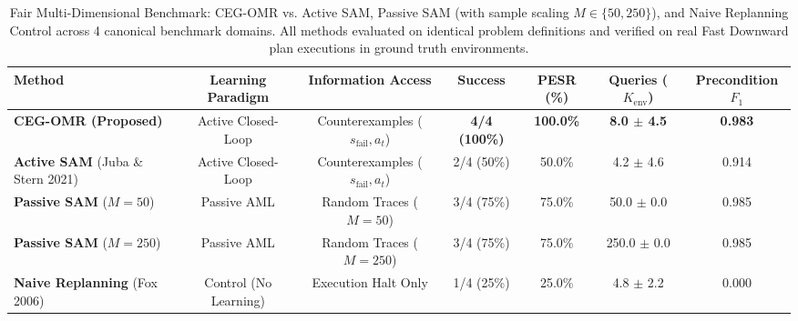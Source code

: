 \begin{table}[t]
\centering
\caption{Fair Multi-Dimensional Benchmark: CEG-OMR vs. Active SAM, Passive SAM (with sample scaling $M \in \{50, 250\}$), and Naive Replanning Control across 4 canonical benchmark domains. All methods evaluated on identical problem definitions and verified on real Fast Downward plan executions in ground truth environments.}
\label{tab:fair_comparison}
\small
\begin{tabular}{lcccccc}
\toprule
\textbf{Method} & \textbf{Learning Paradigm} & \textbf{Information Access} & \textbf{Success} & \textbf{PESR (\%)} & \textbf{Queries ($K_{\text{env}}$)} & \textbf{Precondition $F_1$} \\
\midrule
\textbf{CEG-OMR (Proposed)} & Active Closed-Loop & Counterexamples ($s_{\text{fail}}, a_t$) & \textbf{4/4 (100\%)} & \textbf{100.0\%} & \textbf{8.0 $\pm$ 4.5} & \textbf{0.983} \\
\textbf{Active SAM} (Juba \& Stern 2021) & Active Closed-Loop & Counterexamples ($s_{\text{fail}}, a_t$) & 2/4 (50\%) & 50.0\% & 4.2 $\pm$ 4.6 & 0.914 \\
\textbf{Passive SAM} ($M=50$) & Passive AML & Random Traces ($M=50$) & 3/4 (75\%) & 75.0\% & 50.0 $\pm$ 0.0 & 0.985 \\
\textbf{Passive SAM} ($M=250$) & Passive AML & Random Traces ($M=250$) & 3/4 (75\%) & 75.0\% & 250.0 $\pm$ 0.0 & 0.985 \\
\textbf{Naive Replanning} (Fox 2006) & Control (No Learning) & Execution Halt Only & 1/4 (25\%) & 25.0\% & 4.8 $\pm$ 2.2 & 0.000 \\
\bottomrule
\end{tabular}
\end{table}
